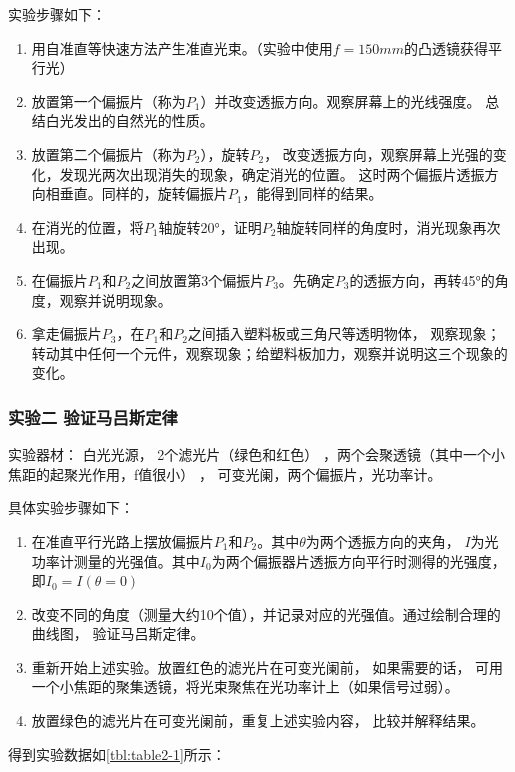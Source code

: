 \documentclass[dvipsnames, svgnames,a4paper,11pt]{article}
\begin{document}
	实验步骤如下：
	\begin{enumerate}
		\item 用自准直等快速方法产生准直光束。（实验中使用$f=150mm$的凸透镜获得平行光）
		\item 放置第一个偏振片（称为$P_1$）并改变透振方向。观察屏幕上的光线强度。 总结白光发出的自然光的性质。

		\item 放置第二个偏振片（称为$P_2$），旋转$P_2$， 改变透振方向，观察屏幕上光强的变化，发现光两次出现消失的现象，确定消光的位置。 这时两个偏振片透振方向相垂直。同样的，旋转偏振片$P_1$，能得到同样的结果。
		\item 在消光的位置，将$P_1$轴旋转20°，证明$P_2$轴旋转同样的角度时，消光现象再次出现。
		\item 在偏振片$P_1$和$P_2$之间放置第3个偏振片$P_3$。先确定$P_3$的透振方向，再转45°的角度，观察并说明现象。
		\item 拿走偏振片$P_3$，在$P_1$和$P_2$之间插入塑料板或三角尺等透明物体， 观察现象；转动其中任何一个元件，观察现象；给塑料板加力，观察并说明这三个现象的变化。

	\end{enumerate}


	\subsubsection{实验二 \quad 验证马吕斯定律}

	实验器材： 白光光源， 2个滤光片（绿色和红色） ，两个会聚透镜（其中一个小焦距的起聚光作用，f值很小） ， 可变光阑，两个偏振片，光功率计。

	具体实验步骤如下：
	\begin{enumerate}
		\item 在准直平行光路上摆放偏振片$P_1$和$P_2$。其中$\theta$为两个透振方向的夹角， $I$为光功率计测量的光强值。其中$I_0$为两个偏振器片透振方向平行时测得的光强度，即$I_0=I(\theta=0)$
		\item 改变不同的角度（测量大约10个值），并记录对应的光强值。通过绘制合理的曲线图， 验证马吕斯定律。
		\item 重新开始上述实验。放置红色的滤光片在可变光阑前， 如果需要的话， 可用一个小焦距的聚集透镜，将光束聚焦在光功率计上（如果信号过弱）。
		\item 放置绿色的滤光片在可变光阑前，重复上述实验内容， 比较并解释结果。
	\end{enumerate}

	得到实验数据如\cref{tbl:table2-1}所示：
\end{document}
